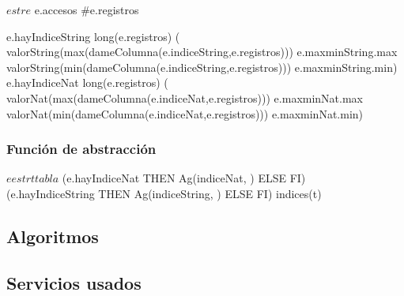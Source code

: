 \begin{Rep}{$estr$}{$e$}
        {e.accesos \ge \#e.registros}

        {e.hayIndiceString \land long(e.registros) \implies (\\
        \hspace*{2em} valorString(max(dameColumna(e.indiceString,e.registros))) \igobs e.maxminString.max \land \\
        \hspace*{2em} valorString(min(dameColumna(e.indiceString,e.registros))) \igobs e.maxminString.min) \land \\
        e.hayIndiceNat \land long(e.registros) \implies (\\
        \hspace*{2em} valorNat(max(dameColumna(e.indiceNat,e.registros))) \igobs e.maxminNat.max \land \\
        \hspace*{2em} valorNat(min(dameColumna(e.indiceNat,e.registros))) \igobs e.maxminNat.min)\\
    }

\end{Rep}

\subsubsection{Función de abstracción}

\begin{ABS}{$e$}{$estr$}{$t$}{$tabla$}
    \absfunc{}
        {(\IFM e.hayIndiceNat THEN Ag(indiceNat, \emptyset) ELSE \emptyset FI) \: \cup \\
        (\IFM e.hayIndiceString THEN Ag(indiceString, \emptyset) ELSE \emptyset FI) \igobs indices(t) \; \land}
\end{ABS}

\subsection{Algoritmos}

\subsection{Servicios usados}

